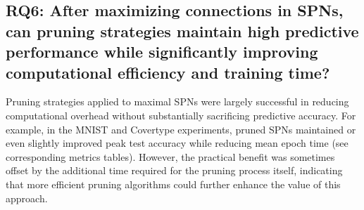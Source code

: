 \subsection*{RQ6: After maximizing connections in SPNs, can pruning strategies maintain high predictive performance while significantly improving computational efficiency and training time?}

Pruning strategies applied to maximal SPNs were largely successful in reducing computational overhead without substantially sacrificing predictive accuracy. For example, in the MNIST and Covertype experiments, pruned SPNs maintained or even slightly improved peak test accuracy while reducing mean epoch time (see corresponding metrics tables). However, the practical benefit was sometimes offset by the additional time required for the pruning process itself, indicating that more efficient pruning algorithms could further enhance the value of this approach.